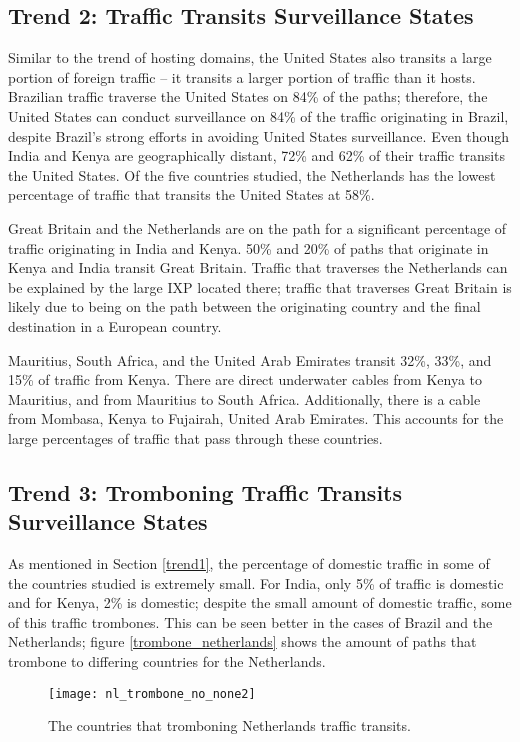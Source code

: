 \subsection{Trend 2: Traffic Transits Surveillance States}
Similar to the trend of hosting domains, the United States also transits a large portion of foreign traffic -- it transits a larger portion of traffic than it hosts.  Brazilian traffic traverse the United States on 84\% of the paths; therefore, the United States can conduct surveillance on 84\% of the traffic originating in Brazil, despite Brazil's strong efforts in avoiding United States surveillance.  Even though India and Kenya are geographically distant, 72\% and 62\% of their traffic transits the United States.  Of the five countries studied, the Netherlands has the lowest percentage of traffic that transits the United States at 58\%.  

Great Britain and the Netherlands are on the path for a significant percentage of traffic originating in India and Kenya.  50\% and 20\% of paths that originate in Kenya and India transit Great Britain.  Traffic that traverses the Netherlands can be explained by the large IXP located there; traffic that traverses Great Britain is likely due to being on the path between the originating country and the final destination in a European country.

Mauritius, South Africa, and the United Arab Emirates transit 32\%, 33\%, and 15\% of traffic from Kenya.  There are direct underwater cables from Kenya to Mauritius, and from Mauritius to South Africa.  Additionally, there is a cable from Mombasa, Kenya to Fujairah, United Arab Emirates.  This accounts for the large percentages of traffic that pass through these countries.

\subsection{Trend 3: Tromboning Traffic Transits Surveillance States}

As mentioned in Section \ref{trend1}, the percentage of domestic traffic in some of the countries studied is extremely small.  For India, only 5\% of traffic is domestic and for Kenya, 2\% is domestic; despite the small amount of domestic traffic, some of this traffic trombones.  This can be seen better in the cases of Brazil and the Netherlands; figure \ref{trombone_netherlands} shows the amount of paths that trombone to differing countries for the Netherlands.

\begin{figure}
\centering
\texttt{[image: nl\_trombone\_no\_none2]}
\caption{The countries that tromboning Netherlands traffic transits.}
\label{fig:trombone_netherlands}
\end{figure}

